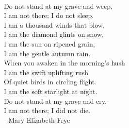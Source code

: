 \newpage
~
\vfill
\begin{english}
\begin{center}
Do not stand at my grave and weep,
\\I am not there; I do not sleep.
\\I am a thousand winds that blow,
\\I am the diamond glints on snow,
\\I am the sun on ripened grain,
\\I am the gentle autumn rain.
\\When you awaken in the morning’s hush
\\I am the swift uplifting rush
\\Of quiet birds in circling flight.
\\I am the soft starlight at night.
\\Do not stand at my grave and cry,
\\I am not there; I did not die. 
\\- Mary Elizabeth Frye
\end{center}
\end{english}
\vfill
~
\newpage
